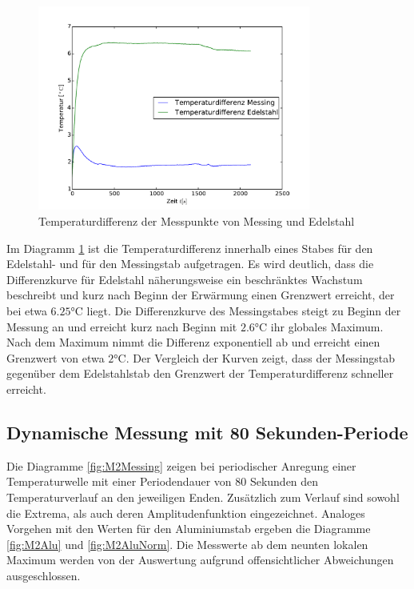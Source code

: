 \begin{figure}[htp]
	\label{fig:tempverl}
	\centering
	\includegraphics[width=0.8\textwidth]{Bilder/M1_Tempdiff.pdf}
	\caption{Temperaturdifferenz der Messpunkte von Messing und Edelstahl}
\end{figure}

Im Diagramm \ref{fig:tempverl} ist die Temperaturdifferenz innerhalb eines Stabes für den Edelstahl- und für den Messingstab aufgetragen. 
Es wird deutlich, dass die Differenzkurve für Edelstahl näherungsweise ein beschränktes Wachstum beschreibt und kurz nach Beginn der Erwärmung einen Grenzwert erreicht, der bei etwa  $6.25 \si{\degreeCelsius}$ liegt.
Die Differenzkurve des Messingstabes steigt zu Beginn der Messung an und erreicht kurz nach Beginn mit $2.6 \si{\degreeCelsius}$ ihr globales Maximum. 
Nach dem Maximum nimmt die Differenz exponentiell ab und erreicht einen Grenzwert von etwa $2 \si{\degreeCelsius}$.
Der Vergleich der Kurven zeigt, dass der Messingstab gegenüber dem Edelstahlstab den Grenzwert der Temperaturdifferenz schneller erreicht.

\subsection{Dynamische Messung mit 80 Sekunden-Periode}
Die Diagramme \ref{fig:M2Messing} zeigen bei periodischer Anregung einer Temperaturwelle mit einer Periodendauer von 80 Sekunden den Temperaturverlauf an den jeweiligen Enden. 
Zusätzlich zum Verlauf sind sowohl die Extrema, als auch deren Amplitudenfunktion eingezeichnet. 
Analoges Vorgehen mit den Werten für den Aluminiumstab ergeben die Diagramme \ref{fig:M2Alu} und \ref{fig:M2AluNorm}.
Die Messwerte ab dem neunten lokalen Maximum werden von der Auswertung aufgrund offensichtlicher Abweichungen ausgeschlossen.

